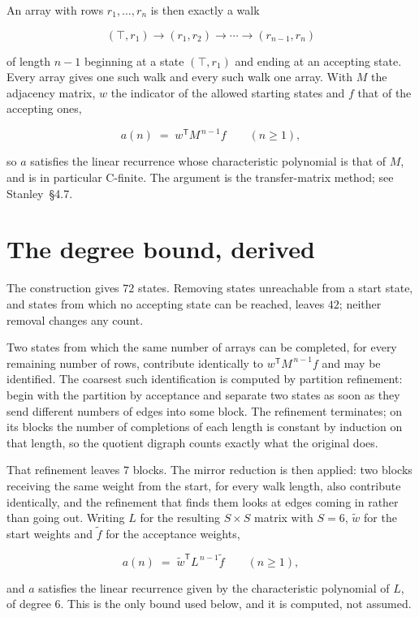 \documentclass[11pt]{article}
\theoremstyle{definition}
\begin{document}
An array with rows $r_1,\dots,r_n$ is then exactly a walk

\[(\top,r_1) \to (r_1,r_2) \to \cdots \to (r_{n-1},r_n)\]

of length $n-1$ beginning at a state $(\top,r_1)$ and ending at an accepting state. Every array gives one such walk and every such walk one array. With $M$ the adjacency matrix, $w$ the indicator of the allowed starting states and $f$ that of the accepting ones,

\[a(n) \;=\; w^{\mathsf T} M^{\,n-1} f \qquad (n \ge 1),\]

so $a$ satisfies the linear recurrence whose characteristic polynomial is that of $M$, and is in particular C-finite. The argument is the transfer-matrix method; see Stanley~\S4.7.

\section{The degree bound, derived}

The construction gives $72$ states. Removing states unreachable from a start state, and states from which no accepting state can be reached, leaves $42$; neither removal changes any count.

Two states from which the same number of arrays can be completed, for every remaining number of rows, contribute identically to $w^{\mathsf T}M^{\,n-1}f$ and may be identified. The coarsest such identification is computed by partition refinement: begin with the partition by acceptance and separate two states as soon as they send different numbers of edges into some block. The refinement terminates; on its blocks the number of completions of each length is constant by induction on that length, so the quotient digraph counts exactly what the original does.

That refinement leaves $7$ blocks. The mirror reduction is then applied: two blocks receiving the same weight from the start, for every walk length, also contribute identically, and the refinement that finds them looks at edges coming in rather than going out. Writing $L$ for the resulting $S \times S$ matrix with $S = 6$, $\tilde w$ for the start weights and $\tilde f$ for the acceptance weights,

\[a(n) \;=\; \tilde w^{\mathsf T} L^{\,n-1} \tilde f \qquad (n \ge 1),\]

and $a$ satisfies the linear recurrence given by the characteristic polynomial of $L$, of degree $6$. This is the only bound used below, and it is computed, not assumed.
\end{document}
